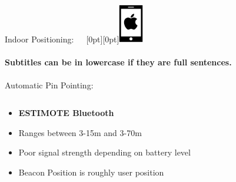 \documentclass[11pt]{beamer}
\begin{document}
\begin{frame}{Indoor Positioning:~~~\raisebox{-10pt}[0pt][0pt]{\includegraphics[width=0.08\textwidth]{tech-stack-apple}}}

\framesubtitle{Subtitles can be in lowercase if they are full sentences.}
Automatic Pin Pointing:

  \begin{columns}[T]

    \begin{column}{.6\textwidth}

      \begin{itemize}
        \item \textbf{ESTIMOTE Bluetooth} \\
        \item Ranges between 3-15m and 3-70m
        \item Poor signal strength depending on battery level
        \item Beacon Position is roughly user position
      \end{itemize}

    \end{column}


\end{columns}
\end{frame}
\end{document}
